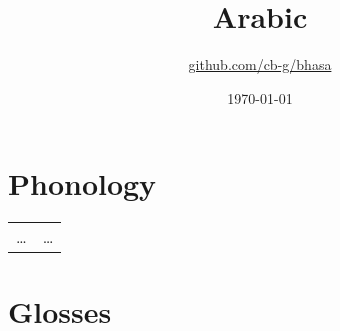 \documentclass{article}
\title{Arabic\\\ipa{[al Qara"bij:a]}}
\author{\href{https://github.com/cb-g/bhasa}{github.com/cb-g/bhasa}}
\date{\today}
\begin{document}
\pagecolor{custom_bg}\color{custom_fg}
\maketitle\thispagestyle{empty}

\newpage\setcounter{page}{1}\section{Phonology}

\begin{xltabular}{\textwidth}{lL}
  \dots & \dots \\
\end{xltabular}

\newpage\section{Glosses}
\end{document}
